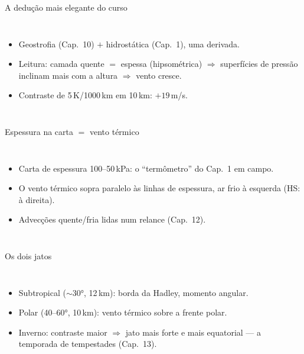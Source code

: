 \documentclass[aspectratio=169,11pt]{beamer}
\begin{document}
\begin{frame}{A dedução mais elegante do curso}
  \begin{columns}
    \vspace{0.4em}
    \begin{itemize}
      \item Geostrofia (Cap.~10) $+$ hidrostática (Cap.~1), uma
            derivada.
      \item Leitura: camada quente $=$ espessa (hipsométrica)
            $\Rightarrow$ superfícies de pressão inclinam mais com a
            altura $\Rightarrow$ vento cresce.
      \item Contraste de 5\,K/1000\,km em 10\,km: $+19$\,m/s.
    \end{itemize}
  \end{columns}
\end{frame}

\begin{frame}{Espessura na carta $=$ vento térmico}
  \begin{columns}
    \begin{itemize}
      \item Carta de espessura 100--50\,kPa: o ``termômetro'' do
            Cap.~1 em campo.
      \item O vento térmico sopra \alert{paralelo às linhas de
            espessura}, ar frio à esquerda (HS: à direita).
      \item Advecções quente/fria lidas num relance (Cap.~12).
    \end{itemize}
  \end{columns}
\end{frame}

\begin{frame}{Os dois jatos}
  \begin{columns}
    \begin{itemize}
      \item \alert{Subtropical} ($\sim$30°, 12\,km): borda da Hadley,
            momento angular.
      \item \alert{Polar} (40--60°, 10\,km): vento térmico sobre a
            frente polar.
      \item Inverno: contraste maior $\Rightarrow$ jato mais forte e
            mais equatorial — a temporada de tempestades (Cap.~13).
    \end{itemize}
  \end{columns}
\end{frame}
\end{document}
